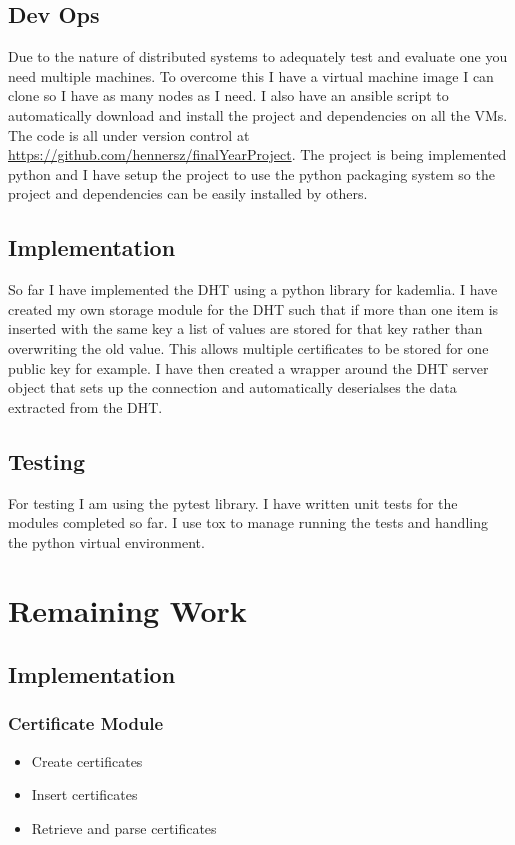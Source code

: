 \documentclass[10pt, a4paper]{article}
\begin{document}
\subsection{Dev Ops}
Due to the nature of distributed systems to adequately test and evaluate one you need multiple machines. To overcome this I have a virtual machine image I can clone so I have as many nodes as I need. I also have an ansible script to automatically download and install the project and dependencies on all the VMs. The code is all under version control at \url{https://github.com/hennersz/finalYearProject}. The project is being implemented python and I have setup the project to use the python packaging system so the project and dependencies can be easily installed by others.
\subsection{Implementation}
So far I have implemented the DHT using a python library for kademlia. I have created my own storage module for the DHT such that if more than one item is inserted with the same key a list of values are stored for that key rather than overwriting the old value. This allows multiple certificates to be stored for one public key for example. I have then created a wrapper around the DHT server object that sets up the connection and automatically deserialses the data extracted from the DHT. 
\subsection{Testing}
For testing I am using the pytest library. I have written unit tests for the modules completed so far. I use tox to manage running the tests and handling the python virtual environment.
\section{Remaining Work}
\subsection{Implementation}
\subsubsection{Certificate Module}
\begin{itemize}[noitemsep]
  \item Create certificates
  \item Insert certificates
  \item Retrieve and parse certificates
\end{itemize}
\end{document}
